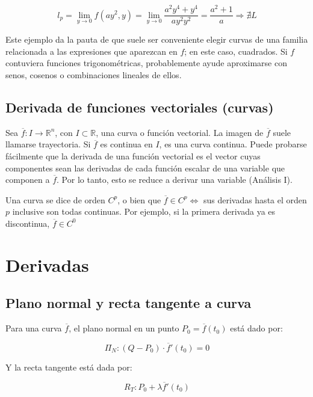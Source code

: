 \documentclass{article}
\renewcommand{\Bbb}{\mathbb}
\begin{document}
\begin{equation}
l_p = \lim_{y \rightarrow 0} f(ay^2, y) = \lim_{y \rightarrow 0} \frac{a^2 y^4 + y^4}{ay^2y^2} = \frac{a^2 + 1}{a} \Rightarrow \nexists L
\end{equation}

Este ejemplo da la pauta de que suele ser conveniente elegir curvas de una familia relacionada a las expresiones que aparezcan en $f$; en este caso, cuadrados. Si $f$ contuviera funciones trigonométricas, probablemente ayude aproximarse con senos, cosenos o combinaciones lineales de ellos.

\subsection{Derivada de funciones vectoriales (curvas)}

Sea $\overline{f}:I \rightarrow \Bbb R^n$, con $I \subset \Bbb R$, una curva o función vectorial. La imagen de $\overline{f}$ suele llamarse trayectoria. Si $\overline{f}$ es continua en $I$, es una curva continua. Puede probarse fácilmente que la derivada de una función vectorial es el vector cuyas componentes sean las derivadas de cada función escalar de una variable que componen a $\overline{f}$. Por lo tanto, esto se reduce a derivar una variable (Análisis I).

Una curva se dice de orden $C^p$, o bien que $\overline{f} \in C^p \Longleftrightarrow$ sus derivadas hasta el orden $p$ inclusive son todas continuas. Por ejemplo, si la primera derivada ya es discontinua, $\overline{f} \in C^0$

\section{Derivadas}

\subsection{Plano normal y recta tangente a curva}

Para una curva $\overline{f}$, el plano normal en un punto $P_0 = \overline{f}(t_0)$ está dado por:

\begin{equation}
\Pi_N : (Q - P_0) \cdot \overline{f}'(t_0) = 0
\end{equation}

Y la recta tangente está dada por:

\begin{equation}
R_T: P_0 + \lambda \overline{f}'(t_0)
\end{equation}
\end{document}

